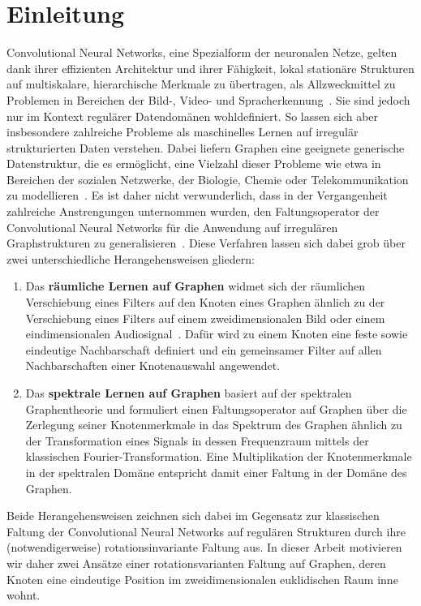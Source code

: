 \chapter{Einleitung}
\label{einleitung}

Convolutional Neural Networks, eine Spezialform der neuronalen Netze, gelten dank ihrer effizienten Architektur und ihrer Fähigkeit, lokal stationäre Strukturen auf multiskalare, hierarchische Merkmale zu übertragen, als Allzweckmittel zu Problemen in Bereichen der Bild-, Video- und Spracherkennung~\cite{Defferrard}.
Sie sind jedoch nur im Kontext regulärer Datendomänen wohldefiniert.
So lassen sich aber insbesondere zahlreiche Probleme als maschinelles Lernen auf irregulär strukturierten Daten verstehen.
Dabei liefern Graphen eine geeignete generische Datenstruktur, die es ermöglicht, eine Vielzahl dieser Probleme wie etwa in Bereichen der sozialen Netzwerke, der Biologie, Chemie oder Telekommunikation zu modellieren~\cite{Shuman}.
Es ist daher nicht verwunderlich, dass in der Vergangenheit zahlreiche Anstrengungen unternommen wurden, den Faltungsoperator der Convolutional Neural Networks für die Anwendung auf irregulären Graphstrukturen zu generalisieren~\cite{patchy, Defferrard, gcn}.
Diese Verfahren lassen sich dabei grob über zwei unterschiedliche Herangehensweisen gliedern:
\begin{enumerate}
  \item Das \textbf{räumliche Lernen auf Graphen} widmet sich der räumlichen Verschiebung eines Filters auf den Knoten eines Graphen ähnlich zu der Verschiebung eines Filters auf einem zweidimensionalen Bild oder einem eindimensionalen Audiosignal~\cite{patchy}.
  Dafür wird zu einem Knoten eine feste sowie eindeutige Nachbarschaft definiert und ein gemeinsamer Filter auf allen Nachbarschaften einer Knotenauswahl angewendet.
  \item Das \textbf{spektrale Lernen auf Graphen} basiert auf der spektralen Graphentheorie und formuliert einen Faltungsoperator auf Graphen über die Zerlegung seiner Knotenmerkmale in das Spektrum des Graphen ähnlich zu der Transformation eines Signals in dessen Frequenzraum mittels der klassischen Fourier-Transformation.
  Eine Multiplikation der Knotenmerkmale in der spektralen Domäne entspricht damit einer Faltung in der Domäne des Graphen.
\end{enumerate}
Beide Herangehensweisen zeichnen sich dabei im Gegensatz zur klassischen Faltung der Convolutional Neural Networks auf regulären Strukturen durch ihre (notwendigerweise) rotationsinvariante Faltung aus.
In dieser Arbeit motivieren wir daher zwei Ansätze \bzgl{} einer rotationsvarianten Faltung auf Graphen, deren Knoten eine eindeutige Position im zweidimensionalen euklidischen Raum inne wohnt.



